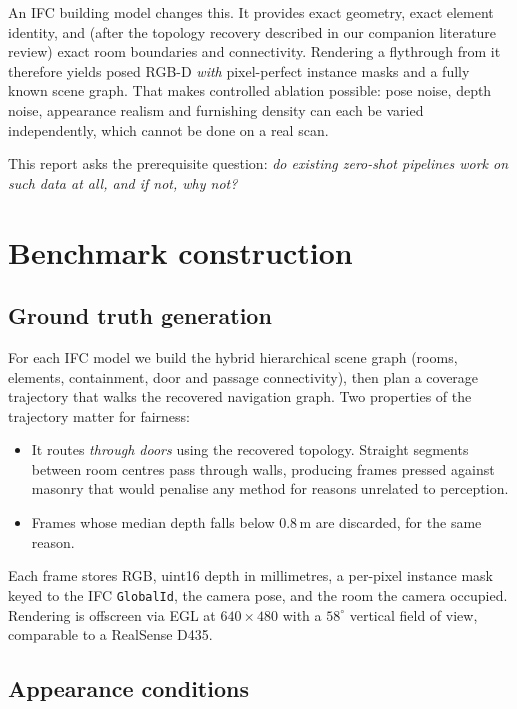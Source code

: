 \documentclass[11pt,a4paper]{article}
\begin{document}
An IFC building model changes this. It provides exact geometry, exact element
identity, and (after the topology recovery described in our companion
literature review) exact room boundaries and connectivity. Rendering a
flythrough from it therefore yields posed RGB-D \emph{with} pixel-perfect
instance masks and a fully known scene graph. That makes controlled ablation
possible: pose noise, depth noise, appearance realism and furnishing density can
each be varied independently, which cannot be done on a real scan.

This report asks the prerequisite question: \emph{do existing zero-shot pipelines
work on such data at all, and if not, why not?}

\section{Benchmark construction}

\subsection{Ground truth generation}

For each IFC model we build the hybrid hierarchical scene graph (rooms,
elements, containment, door and passage connectivity), then plan a coverage
trajectory that walks the recovered navigation graph. Two properties of the
trajectory matter for fairness:

\begin{itemize}
\item It routes \emph{through doors} using the recovered topology. Straight
segments between room centres pass through walls, producing frames pressed
against masonry that would penalise any method for reasons unrelated to
perception.
\item Frames whose median depth falls below 0.8\,m are discarded, for the same
reason.
\end{itemize}

Each frame stores RGB, uint16 depth in millimetres, a per-pixel instance mask
keyed to the IFC \texttt{GlobalId}, the camera pose, and the room the camera
occupied. Rendering is offscreen via EGL at $640\times480$ with a $58^\circ$
vertical field of view, comparable to a RealSense D435.

\subsection{Appearance conditions}
\end{document}
